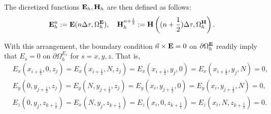 \documentclass[12pt,reqno]{amsart}
\newcommand{\e}{{\bf E}}
\newcommand{\h}{{\bf H}}
\theoremstyle{definition}
\numberwithin{equation}{section}
\def\Gwh{\Omega_h}
\begin{document}
    The dicretized functions $\e_h, \h_h$ are then defined as follows:
    $$
    \e_h^n:=\e(n\Delta \tau,\Gwh^\e),\quad  \h_h^{n+\frac{1}{2}}:=\h\left ((n+\frac{1}{2})\Delta \tau,\Gwh^\h\right).
    $$

	With this arrangement, the boundary condition 
	$\vec{n}\times {\bf E}=0$ on $\partial \Gwh^{{\bf E}}$ readily imply that 
	$E_s=0$ on $\partial \Gwh^{E_s}$ for $s=x,y,z$. That is, 
	\begin{align*}
		&
		E_x(x_{i+\frac{1}{2}},0,z_j)=E_x(x_{i+\frac{1}{2}},N,z_j)=
		E_x(x_{i+\frac{1}{2}},y_j,0)=E_x(x_{i+\frac{1}{2}},y_j, N)=0, \\&
		E_y(0,y_{j+\frac{1}{2}},z_j)=E_y(N,y_{j+\frac{1}{2}},z_j)=
		E_y(x_i,y_{j+\frac{1}{2}},0)=E_y(x_i, y_{j+\frac{1}{2}}, N)=0, \\&
		E_z(0,y_j,z_{k+\frac{1}{2}})=E_x(N,y_j,z_{k+\frac{1}{2}})=
		E_z(x_i,0,z_{k+\frac{1}{2}})=E_z(x_i,N,z_{k+\frac{1}{2}})=0. &
	\end{align*} 
\end{document}
